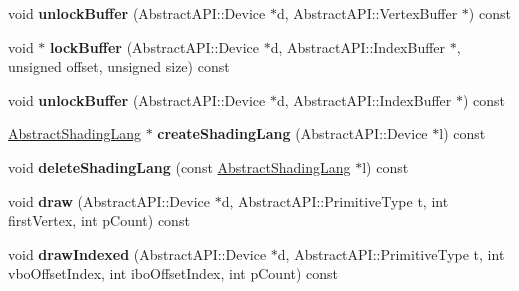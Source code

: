 \begin{DoxyCompactItemize}
\item 
\hypertarget{class_tempest_1_1_opengl2x_a45947e26c0fb520f666ae801c06deec7}{void {\bfseries unlock\+Buffer} (Abstract\+A\+P\+I\+::\+Device $\ast$d, Abstract\+A\+P\+I\+::\+Vertex\+Buffer $\ast$) const }\label{class_tempest_1_1_opengl2x_a45947e26c0fb520f666ae801c06deec7}

\item 
\hypertarget{class_tempest_1_1_opengl2x_a0b09d4e876730b200b3b5a22e3362837}{void $\ast$ {\bfseries lock\+Buffer} (Abstract\+A\+P\+I\+::\+Device $\ast$d, Abstract\+A\+P\+I\+::\+Index\+Buffer $\ast$, unsigned offset, unsigned size) const }\label{class_tempest_1_1_opengl2x_a0b09d4e876730b200b3b5a22e3362837}

\item 
\hypertarget{class_tempest_1_1_opengl2x_a3632dd9f451d1f4ef8c760c2f41e9508}{void {\bfseries unlock\+Buffer} (Abstract\+A\+P\+I\+::\+Device $\ast$d, Abstract\+A\+P\+I\+::\+Index\+Buffer $\ast$) const }\label{class_tempest_1_1_opengl2x_a3632dd9f451d1f4ef8c760c2f41e9508}

\item 
\hypertarget{class_tempest_1_1_opengl2x_a1b96cfb1413cfeca71eacb617c1772ba}{\hyperlink{class_tempest_1_1_abstract_shading_lang}{Abstract\+Shading\+Lang} $\ast$ {\bfseries create\+Shading\+Lang} (Abstract\+A\+P\+I\+::\+Device $\ast$l) const }\label{class_tempest_1_1_opengl2x_a1b96cfb1413cfeca71eacb617c1772ba}

\item 
\hypertarget{class_tempest_1_1_opengl2x_a770dd9106372b898f0676eef4ec2bc19}{void {\bfseries delete\+Shading\+Lang} (const \hyperlink{class_tempest_1_1_abstract_shading_lang}{Abstract\+Shading\+Lang} $\ast$l) const }\label{class_tempest_1_1_opengl2x_a770dd9106372b898f0676eef4ec2bc19}

\item 
\hypertarget{class_tempest_1_1_opengl2x_a61488ff33238999dc9def624f1cee465}{void {\bfseries draw} (Abstract\+A\+P\+I\+::\+Device $\ast$d, Abstract\+A\+P\+I\+::\+Primitive\+Type t, int first\+Vertex, int p\+Count) const }\label{class_tempest_1_1_opengl2x_a61488ff33238999dc9def624f1cee465}

\item 
\hypertarget{class_tempest_1_1_opengl2x_a4c9c29acea2b91e7b2cf16bdc6cc8684}{void {\bfseries draw\+Indexed} (Abstract\+A\+P\+I\+::\+Device $\ast$d, Abstract\+A\+P\+I\+::\+Primitive\+Type t, int vbo\+Offset\+Index, int ibo\+Offset\+Index, int p\+Count) const }\label{class_tempest_1_1_opengl2x_a4c9c29acea2b91e7b2cf16bdc6cc8684}


\end{DoxyCompactItemize}
